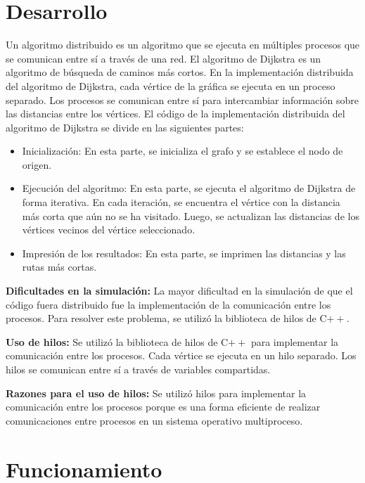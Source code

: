 \documentclass[a4paper,12pt]{article}
\begin{document}
\section*{Desarrollo}

Un algoritmo distribuido es un algoritmo que se ejecuta en múltiples procesos que se comunican entre sí a través de una red. El algoritmo de Dijkstra es un algoritmo de búsqueda de caminos más cortos. En la implementación distribuida del algoritmo de Dijkstra, cada vértice de la gráfica se ejecuta en un proceso separado. Los procesos se comunican entre sí para intercambiar información sobre las distancias entre los vértices. El código de la implementación distribuida del algoritmo de Dijkstra se divide en las siguientes partes:

\begin{itemize}
    \item Inicialización: En esta parte, se inicializa el grafo y se establece el nodo de origen.
    \item Ejecución del algoritmo: En esta parte, se ejecuta el algoritmo de Dijkstra de forma iterativa. En cada iteración, se encuentra el vértice con la distancia más corta que aún no se ha visitado. Luego, se actualizan las distancias de los vértices vecinos del vértice seleccionado.
    \item Impresión de los resultados: En esta parte, se imprimen las distancias y las rutas más cortas.
\end{itemize}

\textbf{Dificultades en la simulación:} La mayor dificultad en la simulación de que el código fuera distribuido fue la implementación de la comunicación entre los procesos. Para resolver este problema, se utilizó la biblioteca de hilos de C$++$.

\textbf{Uso de hilos:} Se utilizó la biblioteca de hilos de C$++$ para implementar la comunicación entre los procesos. Cada vértice se ejecuta en un hilo separado. Los hilos se comunican entre sí a través de variables compartidas.

\textbf{Razones para el uso de hilos:} Se utilizó hilos para implementar la comunicación entre los procesos porque es una forma eficiente de realizar comunicaciones entre procesos en un sistema operativo multiproceso.


\section*{Funcionamiento}
\end{document}
